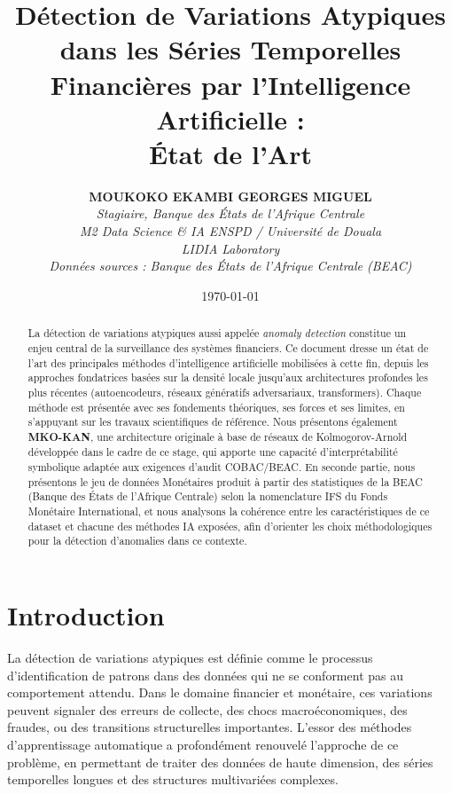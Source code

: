 \documentclass[12pt, a4paper]{article}
\title{
    \textbf{Détection de Variations Atypiques dans les Séries Temporelles\\
    Financières par l'Intelligence Artificielle :}\\[0.3em]
    \large État de l'Art
}
\author{
    \textbf{MOUKOKO EKAMBI GEORGES MIGUEL}\\[0.3em]
    \textit{Stagiaire, Banque des États de l'Afrique Centrale}\\
    \textit{M2 Data Science \& IA  ENSPD / Université de Douala}\\
    \textit{LIDIA Laboratory}\\[0.5em]
    \textit{Données sources : Banque des États de l'Afrique Centrale (BEAC)}\\
}
\date{\today}
\begin{document}
\maketitle

\begin{abstract}
La détection de variations atypiques  aussi appelée \textit{anomaly detection}
 constitue un enjeu central de la surveillance des systèmes financiers.
Ce document dresse un état de l'art des principales méthodes d'intelligence
artificielle mobilisées à cette fin, depuis les approches fondatrices basées
sur la densité locale jusqu'aux architectures profondes les plus récentes
(autoencodeurs, réseaux génératifs adversariaux, transformers).
Chaque méthode est présentée avec ses fondements théoriques, ses forces et ses
limites, en s'appuyant sur les travaux scientifiques de référence.
Nous présentons également \textbf{MKO-KAN}, une architecture originale à base
de réseaux de Kolmogorov-Arnold développée dans le cadre de ce stage, qui apporte
une capacité d'interprétabilité symbolique adaptée aux exigences d'audit COBAC/BEAC.
En seconde partie, nous présentons le jeu de données Monétaires
produit à partir des statistiques de la BEAC (Banque des États de
l'Afrique Centrale) selon la nomenclature IFS du Fonds Monétaire International,
et nous analysons la cohérence entre les caractéristiques de ce dataset et
chacune des méthodes IA exposées, afin d'orienter les choix méthodologiques
pour la détection d'anomalies dans ce contexte.
\end{abstract}

\tableofcontents
\newpage

\section{Introduction}

La détection de variations atypiques est définie comme le processus
d'identification de patrons dans des données qui ne se conforment pas au
comportement attendu. Dans le domaine financier et monétaire, ces variations
peuvent signaler des erreurs de collecte, des chocs macroéconomiques, des
fraudes, ou des transitions structurelles importantes.
L'essor des méthodes d'apprentissage automatique a profondément renouvelé
l'approche de ce problème, en permettant de traiter des données de haute
dimension, des séries temporelles longues et des structures multivariées
complexes.
\end{document}
